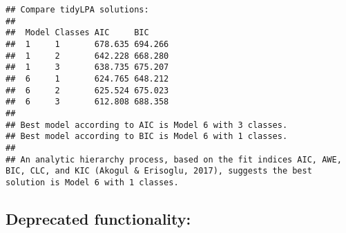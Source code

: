 \documentclass[man]{apa6}
\begin{document}
\begin{verbatim}
## Compare tidyLPA solutions:
## 
##  Model Classes AIC     BIC    
##  1     1       678.635 694.266
##  1     2       642.228 668.280
##  1     3       638.735 675.207
##  6     1       624.765 648.212
##  6     2       625.524 675.023
##  6     3       612.808 688.358
## 
## Best model according to AIC is Model 6 with 3 classes.
## Best model according to BIC is Model 6 with 1 classes.
## 
## An analytic hierarchy process, based on the fit indices AIC, AWE, BIC, CLC, and KIC (Akogul & Erisoglu, 2017), suggests the best solution is Model 6 with 1 classes.
\end{verbatim}

\subsection{Deprecated functionality:}\label{deprecated-functionality}
\end{document}
